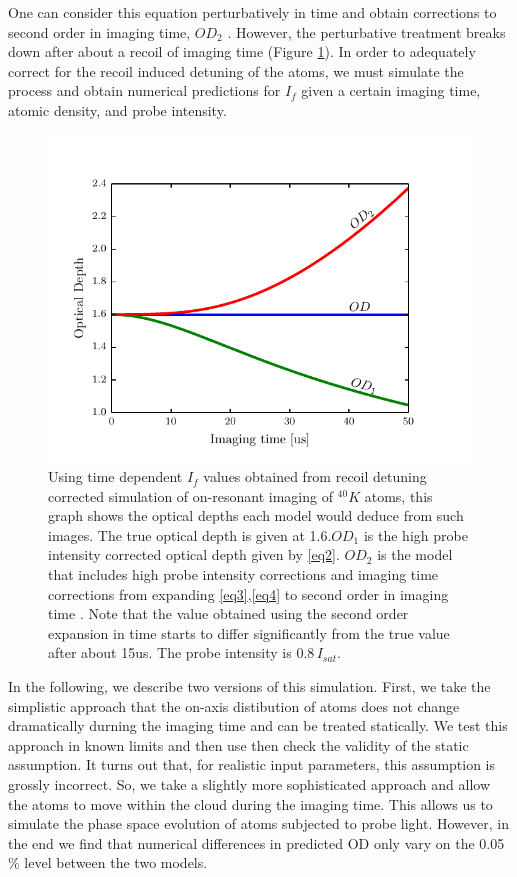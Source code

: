 \documentclass[12pt]{iopart}
\begin{document}
\par One can consider this equation perturbatively in time and obtain corrections to second order in imaging time, $OD_2$  \cite{LJLthesis}. However, the perturbative treatment breaks down after about a recoil of imaging time (Figure \ref{fig:ODcorrections}). In order to adequately correct for the recoil induced detuning of the atoms, we must simulate the process and obtain numerical predictions for $I_f$ given a certain imaging time, atomic density, and probe intensity. 
\begin{figure}
	\includegraphics*{figure2.pdf}
\caption{Using time dependent $I_f$ values obtained from recoil detuning corrected simulation of on-resonant imaging of $^{40}K$ atoms, this graph shows the optical depths each model would deduce from such images. The true optical depth is given at 1.6.$OD_1$ is the high probe intensity corrected optical depth given by \ref{eq2}. $OD_2$ is the model that includes high probe intensity corrections and imaging time corrections from expanding \ref{eq3},\ref{eq4} to second order in imaging time \cite{LJLthesis}. Note that the value obtained using the second order expansion in time starts to differ significantly from the true value after about 15us. The probe intensity is $0.8\, I_{sat}$. }  
\label{fig:ODcorrections}
\end{figure}
\par In the following, we describe two versions of this simulation. First, we take the simplistic approach that the on-axis distibution of atoms does not change dramatically durning the imaging time and can be treated statically. We test this approach in known limits and then use then check the validity of the static assumption. It turns out that, for realistic input parameters, this assumption is grossly incorrect. So, we take a slightly more sophisticated approach and allow the atoms to move within the cloud during the imaging time. This allows us to simulate the phase space evolution of atoms subjected to probe light. However,   
in the end we find that numerical differences in predicted OD only vary on the 0.05$\%$ level between the two models. 
\end{document}
